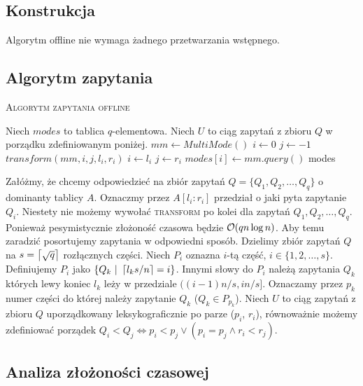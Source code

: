 \subsection{Konstrukcja}
Algorytm offline nie wymaga żadnego przetwarzania wstępnego.

\subsection{Algorytm zapytania}
\begin{algorithm}[H]
    \caption{\textsc{Algorytm zapytania offline}}
    \label{alg:offline-qry}
    \begin{algorithmic}[1]
            \State \small{Niech $modes$ to tablica $q$-elementowa.}
            \State \small{Niech $U$ to ciąg zapytań z zbioru $Q$ w porządku zdefiniowanym poniżej.}
            \State $mm \gets MultiMode()$
            \State $i \gets 0$
            \State $j \gets -1$
                \State $transform(mm, i, j, l_i, r_i)$
                \State $i \gets l_i$
                \State $j \gets r_i$
                \State $modes[i] \gets mm.query()$
            \EndFor
            \State \Return modes
        \EndFunction
    \end{algorithmic}
\end{algorithm}
Załóżmy, że chcemy odpowiedzieć na zbiór zapytań $Q=\{Q_1, Q_2, \dots, Q_q\}$ o dominanty tablicy $A$. Oznaczmy przez $A[l_i:r_i]$ przedział o jaki pyta zapytanie $Q_i$. Niestety nie możemy wywołać \textsc{transform} po kolei dla zapytań $Q_1, Q_2, \dots, Q_q$. Ponieważ pesymistycznie złożoność czasowa będzie $\mathcal{O}(qn\log n)$. Aby temu zaradzić posortujemy zapytania w odpowiedni sposób. Dzielimy zbiór zapytań $Q$ na $s=\left\lceil\sqrt{q}\right\rceil$ rozłącznych części. Niech $P_i$ oznazna $i$-tą część, $i \in \{1,2,\dots,s\}$. Definiujemy $P_i$ jako $\{Q_k\ |\ \left\lceil l_ks / n\right\rceil=i\}$. Innymi słowy do $P_i$ należą zapytania $Q_k$ których lewy koniec $l_k$ leży w przedziale $((i-1)n/s, in/s]$. Oznaczamy przez $p_k$ numer części do której należy zapytanie $Q_k$ ($Q_k \in P_{p_k}$). Niech $U$ to ciąg zapytań z zbioru $Q$ uporządkowany leksykograficznie po parze ($p_i$, $r_i$), równoważnie możemy zdefiniować porządek $Q_i < Q_j \Longleftrightarrow p_i < p_j \lor (p_i = p_j \land r_i < r_j)$.

\subsection{Analiza złożoności czasowej}
